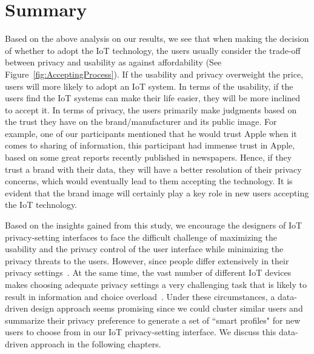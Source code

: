 \section{Summary}
Based on the above analysis on our results, we see that when making the decision of whether to adopt the IoT technology, the users usually consider the trade-off between privacy and usability as against affordability (See Figure~\ref{fig:AcceptingProcess}). If the usability and privacy overweight the price, users will more likely to adopt an IoT system. In terms of the usability, if the users find the IoT systems can make their life easier, they will be more inclined to accept it. In terms of privacy, the users primarily make judgments based on the trust they have on the brand/manufacturer and its public image. For example, one of our participants mentioned that he would trust Apple when it comes to sharing of information, this participant had immense trust in Apple, based on some great reports recently published in newspapers. Hence, if they trust a brand with their data, they will have a better resolution of their privacy concerns, which would eventually lead to them accepting the technology. It is evident that the brand image will certainly play a key role in new users accepting the IoT technology.

Based on the insights gained from this study, we encourage the designers of IoT privacy-setting interfaces to face the difficult challenge of maximizing the usability and the privacy control of the user interface while minimizing the privacy threats to the users. However, since people differ extensively in their privacy settings~\cite{olson2005study}. At the same time, the vast number of different IoT devices makes choosing adequate privacy settings a very challenging task that is likely to result in information and choice overload~\cite{williams2016perfect}. Under these circumstances, a data-driven design approach seems promising since we could cluster similar users and summarize their privacy preference to generate a set of ``smart profiles" for new users to choose from in our IoT privacy-setting interface. We discuss this data-driven approach in the following chapters.
